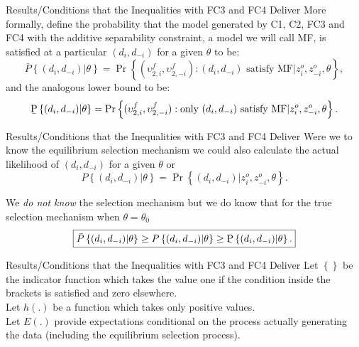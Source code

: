\documentclass[xcolor=pdftex,dvipsnames,table,mathserif]{beamer}
\begin{document}
\begin{frame}{\normalsize Results/Conditions that the Inequalities with FC3 and FC4 Deliver}
More formally, define the probability that the model generated by C1, C2,
FC3 and FC4 with the additive separability constraint, a model we will call
MF, is satisfied at a particular $(d_{i},d_{-i})$ for a given $\theta $ to
be: 
\begin{equation*}
\bar{P}\left\{ (d_{i},d_{-i})|\theta \right\} =\Pr \left\{ (\upsilon
_{2,i}^{f},\upsilon _{2,-i}^{f}):(d_{i},d_{-i})\text{ satisfy MF}%
|z_{i}^{o},z_{-i}^{o},\theta \right\} ,
\end{equation*}%
and the analogous lower bound to be:%
\begin{equation*}
\text{\b{P}}\left\{ (d_{i},d_{-i})|\theta \right\} =\Pr \left\{ (\upsilon
_{2,i}^{f},\upsilon _{2,-i}^{f}):\text{only }(d_{i},d_{-i})\text{ satisfy MF}%
|z_{i}^{o},z_{-i}^{o},\theta \right\} .
\end{equation*}
\end{frame}

\begin{frame}{\normalsize Results/Conditions that the Inequalities with FC3 and FC4 Deliver}
Were we to know the equilibrium selection mechanism we could also calculate
the actual likelihood of $(d_{i},d_{-i})$ for a given $\theta $ or%
\begin{equation*}
P\left\{ (d_{i},d_{-i})|\theta \right\} =\Pr \left\{
(d_{i},d_{-i})|z_{i}^{o},z_{-i}^{o},\theta \right\} .
\end{equation*}

We \textit{do not know} the selection mechanism but we do know that for the true
selection mechanism when $\theta =\theta _{0}$%
\begin{equation*}
\boxed{\bar{P}\left\{ (d_{i},d_{-i})|\theta \right\} \geq P\left\{
(d_{i},d_{-i})|\theta \right\} \geq \text{\b{P}}\left\{
(d_{i},d_{-i})|\theta \right\} .}
\end{equation*}
\end{frame}

\begin{frame}{\normalsize Results/Conditions that the Inequalities with FC3 and FC4 Deliver}
Let $\left\{ {}\right\}$ be the indicator function which takes the value
one if the condition inside the brackets is satisfied and zero elsewhere.\\
\vspace{0.2in}
Let $h(.)$ be a function which takes only positive values.\\
\vspace{0.2in}
Let $E(.)$ provide expectations conditional on the process actually generating the data
(including the equilibrium selection process).
\end{frame}
\end{document}
